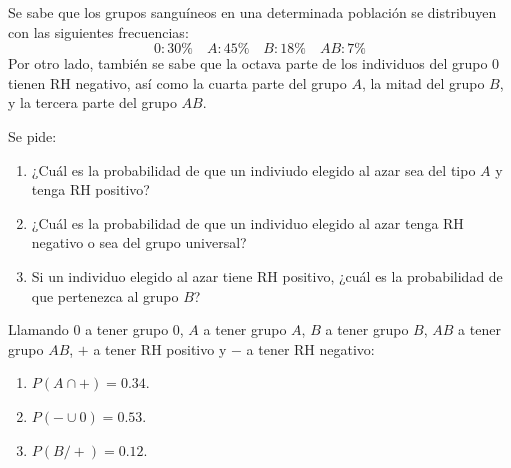 {Se sabe que los grupos sanguíneos en una determinada población se distribuyen con las siguientes frecuencias:
\[
0: 30\% \quad A:45\% \quad B: 18\% \quad AB:7\% 
\]
Por otro lado, también se sabe que la octava parte de los individuos del grupo $0$ tienen RH negativo, así como la
cuarta parte del grupo $A$, la mitad del grupo $B$, y la tercera parte del grupo $AB$.

Se pide:
\begin{enumerate}
\item ¿Cuál es la probabilidad de que un indiviudo elegido al azar sea del tipo $A$ y tenga RH positivo?
\item ¿Cuál es la probabilidad de que un individuo elegido al azar tenga RH negativo o sea del grupo universal?
\item Si un individuo elegido al azar tiene RH positivo, ¿cuál es la probabilidad de que pertenezca al grupo $B$?
\end{enumerate} 
}
{Llamando $0$ a tener grupo 0, $A$ a tener grupo $A$, $B$ a tener grupo $B$, $AB$ a tener grupo $AB$, $+$ a tener RH
positivo y $-$ a tener RH negativo:
\begin{enumerate}
\item $P(A\cap +)=0.34.$
\item $P(-\cup 0)=0.53.$
\item $P(B/+)=0.12$.
\end{enumerate}
}
